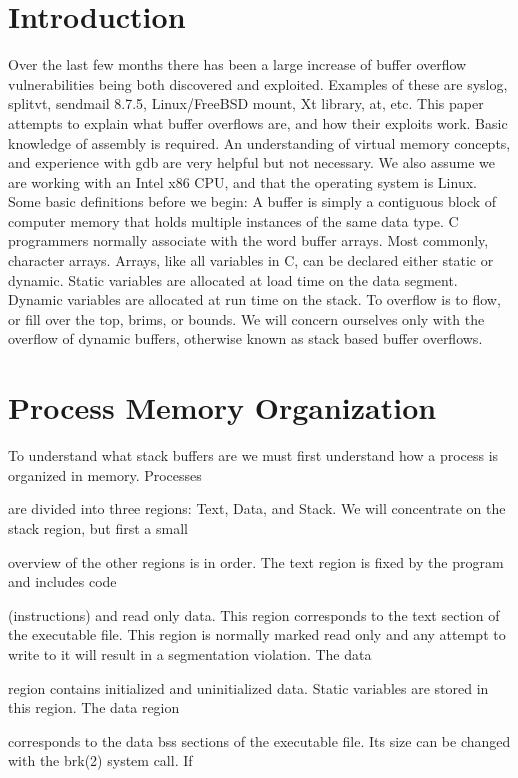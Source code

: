 \documentclass[10pt]{article}
\begin{document}
\section{Introduction}
Over the last few months there has been a large increase of buffer overflow vulnerabilities being both discovered and exploited. Examples of these are syslog, splitvt, sendmail 8.7.5, Linux/FreeBSD mount, Xt library, at, etc. This paper attempts to explain what buffer overflows are, and how their exploits work. Basic  knowledge of assembly is required. An understanding of virtual memory concepts, and experience with gdb are  very helpful but not necessary. We also assume we are working with an Intel x86 CPU, and that the operating  system is Linux. Some basic definitions before we begin: A buffer is simply a contiguous block of computer  memory that holds multiple instances of  the same data type. C programmers normally associate with the word  buffer arrays. Most commonly, character arrays. Arrays, like all variables in C,  can be declared either static or  dynamic. Static variables are allocated at load time on the data segment. Dynamic variables are allocated at  run  time on the stack. To overflow is to flow, or fill over the top, brims, or bounds.
We will concern ourselves only  with the overflow of dynamic buffers,
otherwise known as stack based buffer overflows.

\section{Process Memory Organization}

To understand what stack buffers are we must first understand how a process is organized in memory. Processes 

are divided into three regions: Text, Data, and Stack. We will concentrate on the stack region, but first a small 

overview of the other regions is in order. The text region is fixed by the program and includes code 

(instructions) and read only data. This region corresponds to the text section of the executable file. This region is normally marked read only and any attempt to write to it will result in a segmentation violation. The data 

region contains initialized and uninitialized data. Static variables are stored in this region. The data region 

corresponds to the data bss sections of the executable file. Its size can be changed with the brk(2) system call. If 
\end{document}
